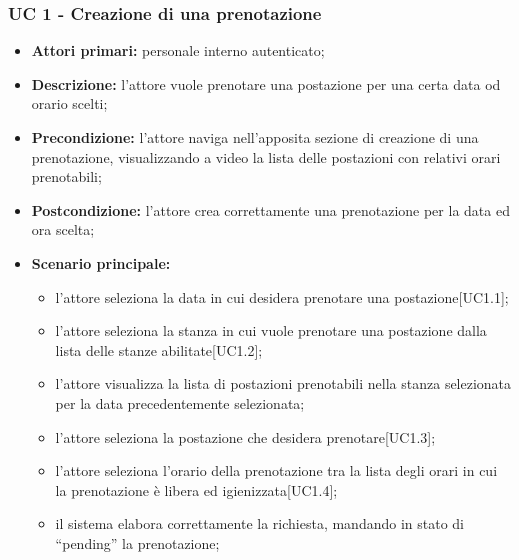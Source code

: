 \subsubsection{UC 1 - Creazione di una prenotazione}

\begin{itemize}
\item \textbf{Attori primari:} personale interno autenticato;
\item \textbf{Descrizione:} l'attore vuole prenotare una postazione per una certa data od orario scelti;
\item \textbf{Precondizione:} l'attore naviga nell’apposita sezione di creazione di una prenotazione, visualizzando a video la lista delle postazioni con relativi orari prenotabili;
\item \textbf{Postcondizione:} l'attore crea correttamente una prenotazione per la data ed ora scelta;
\item \textbf{Scenario principale:} 
	\begin{itemize}
		\item l'attore seleziona la data in cui desidera prenotare una postazione[UC1.1];
		\item l'attore seleziona la stanza in cui vuole prenotare una postazione dalla lista delle stanze abilitate[UC1.2];
		\item l'attore visualizza la lista di postazioni prenotabili nella stanza selezionata per la data precedentemente selezionata;
		\item l'attore seleziona la postazione che desidera prenotare[UC1.3];
		\item l'attore seleziona l'orario della prenotazione tra la lista degli orari in cui la prenotazione è libera ed igienizzata[UC1.4];
		\item il sistema elabora correttamente la richiesta, mandando in stato di “pending” la prenotazione;
	\end{itemize}
\end{itemize}


